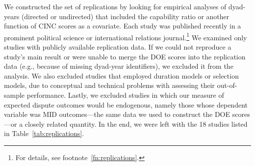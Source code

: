 
We constructed the set of replications by looking for empirical analyses of dyad-years (directed or undirected) that included the capability ratio or another function of CINC scores as a covariate.
Each study was published recently in a prominent political science or international relations journal.\footnote{
  For details, see footnote~\ref{fn:replications}.
}
We examined only studies with publicly available replication data.
If we could not reproduce a study's main result or were unable to merge the DOE scores into the replication data (e.g., because of missing dyad-year identifiers), we excluded it from the analysis.
We also excluded studies that employed duration models or selection models, due to conceptual and technical problems with assessing their out-of-sample performance.
Lastly, we excluded studies in which our measure of expected dispute outcomes would be endogenous, namely those whose dependent variable was MID outcomes---the same data we used to construct the DOE scores---or a closely related quantity.
In the end, we were left with the 18 studies listed in Table~\ref{tab:replications}.

